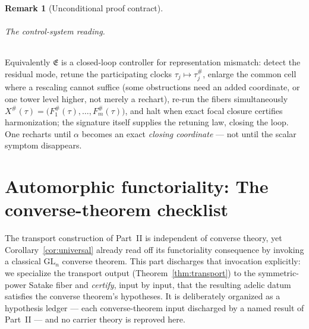\documentclass[11pt]{article}
\theoremstyle{definition}
\newtheorem{remark}[theorem]{Remark}
\begin{document}
\begin{remark}[Unconditional proof contract]
\begin{enumerate}
\paragraph{The control-system reading.} Equivalently $\mathfrak E$ is a closed-loop controller for representation
mismatch: detect the residual mode, retune the participating clocks $\tau_j\mapsto\tau_j^\#$, enlarge the common
cell where a rescaling cannot suffice (some obstructions need an added coordinate, or one tower level higher, not
merely a rechart), re-run the fibers simultaneously $X^\#(\tau)=\big(F_1^\#(\tau),\dots,F_m^\#(\tau)\big)$, and
halt when exact focal closure certifies harmonization; the signature itself supplies the retuning law, closing the
loop. One recharts until $\alpha$ becomes an exact \emph{closing coordinate} --- not until the scalar symptom
disappears.

\part{Automorphic functoriality: The converse-theorem checklist}

\noindent The transport construction of Part~II is independent of converse theory, yet
Corollary~\ref{cor:universal} already read off its functoriality consequence by invoking a classical
$\mathrm{GL}_n$ converse theorem. This part discharges that invocation explicitly: we specialize the transport
output (Theorem~\ref{thm:transport}) to the symmetric-power Satake fiber and \emph{certify}, input by input, that
the resulting adelic datum satisfies the converse theorem's hypotheses. It is deliberately organized as a
hypothesis ledger --- each converse-theorem input discharged by a named result of Part~II --- and no carrier
theory is reproved here.


\end{enumerate}
\end{remark}
\end{document}
